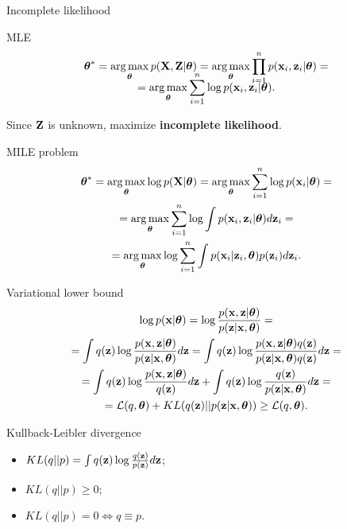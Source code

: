 \begin{frame}{Incomplete likelihood}
        \begin{block}{MLE}
            \vspace{-0.7cm}
            \begin{multline*}
                \vspace{-0.5cm}
                \btheta^* = \argmax_{\btheta} p(\bX, \bZ | \btheta) = \argmax_{\btheta} \prod_{i=1}^n p(\bx_i, \bz_i | \btheta) = \\ = \argmax_{\btheta} \sum_{i=1}^n \log p(\bx_i, \bz_i | \btheta).
            \end{multline*}
            \vspace{-0.5cm}
        \end{block}
	Since $\mathbf{Z}$ is unknown, maximize \textbf{incomplete likelihood}.
    \begin{block}{MILE problem}
        \vspace{-0.7cm}
    	\begin{multline*}
        	\boldsymbol{\theta}^* = \operatorname*{arg\,max}_{\boldsymbol{\theta}} \log p(\mathbf{X}| \boldsymbol{\theta}) = \operatorname*{arg\,max}_{\boldsymbol{\theta}} \sum_{i=1}^n \log p(\mathbf{x}_i | \boldsymbol{\theta}) = \\ =  \operatorname*{arg\,max}_{\boldsymbol{\theta}}  \sum_{i=1}^n \log \int p(\mathbf{x}_i, \mathbf{z}_i | \boldsymbol{\theta}) d \mathbf{z}_i = \\ = \operatorname*{arg\,max}_{\boldsymbol{\theta}} \log \sum_{i=1}^n \int p(\mathbf{x}_i| \mathbf{z}_i, \boldsymbol{\theta}) p(\mathbf{z}_i) d\mathbf{z}_i.
    	\end{multline*}
	\end{block}
	
\end{frame}
\begin{frame}{Variational lower bound}
	\begin{multline*}
		\log p(\mathbf{x}| \boldsymbol{\theta}) 
		= \log \frac{p(\mathbf{x}, \mathbf{z}| \boldsymbol{\theta})}{p(\mathbf{z}|\mathbf{x}, \boldsymbol{\theta})} = \\ 
		= \int q(\mathbf{z}) \log \frac{p(\mathbf{x}, \mathbf{z}| \boldsymbol{\theta})}{p(\mathbf{z}|\mathbf{x}, \boldsymbol{\theta})}d\mathbf{z}
		= \int q(\mathbf{z}) \log \frac{p(\mathbf{x}, \mathbf{z}| \boldsymbol{\theta}) q(\mathbf{z})}{p(\mathbf{z}|\mathbf{x}, \boldsymbol{\theta}) q(\mathbf{z})} d\mathbf{z} = \\
		= \int q(\mathbf{z}) \log \frac{p(\mathbf{x}, \mathbf{z} | \boldsymbol{\theta})}{q(\mathbf{z})}d\mathbf{z} + \int q(\mathbf{z}) \log \frac{q(\mathbf{z})}{p(\mathbf{z}|\mathbf{x}, \boldsymbol{\theta})}d\mathbf{z} = \\ 
		= \mathcal{L} (q, \boldsymbol{\theta}) + KL(q(\mathbf{z}) || p(\mathbf{z}|\mathbf{x}, \boldsymbol{\theta})) \geq \mathcal{L} (q, \boldsymbol{\theta}).
	\end{multline*}
	\vspace{-0.5cm}
	\begin{block}{Kullback-Leibler divergence}
	    \begin{itemize}
	    	\item $KL(q || p) = \int q(\mathbf{z}) \log \frac{q(\mathbf{z})}{p(\mathbf{z})} d \mathbf{z}$;
	        \item $KL(q || p) \geq 0$;
	        \item $KL(q || p) = 0 \Leftrightarrow q \equiv p$.
	    \end{itemize}
	\end{block}
\end{frame}
